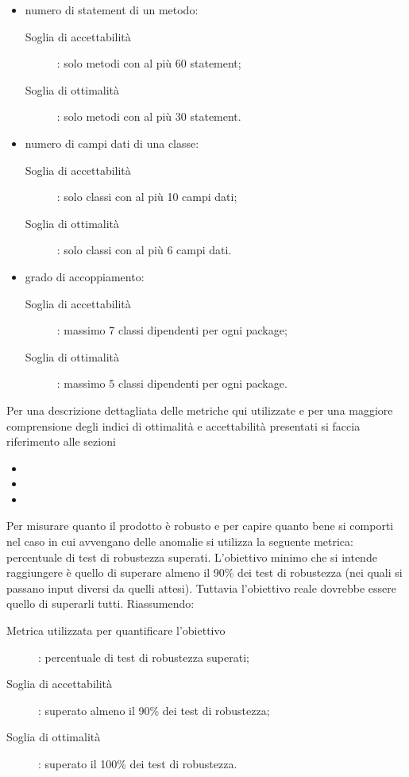 					\begin{itemize}
						\item numero di statement di un metodo:
						\begin{description}
							\item[Soglia di accettabilità]: solo metodi con al più 60 statement;
							\item[Soglia di ottimalità]: solo metodi con al più 30 statement.
						\end{description}
						\item numero di campi dati di una classe:
						\begin{description}
							\item[Soglia di accettabilità]: solo classi con al più 10 campi dati;
							\item[Soglia di ottimalità]: solo classi con al più 6 campi dati.
						\end{description}
						\item grado di accoppiamento:
						\begin{description}
							\item[Soglia di accettabilità]: massimo 7 classi dipendenti per ogni package;
							\item[Soglia di ottimalità]: massimo 5 classi dipendenti per ogni package.
						\end{description}
					\end{itemize}
					Per una descrizione dettagliata delle metriche qui utilizzate e per una maggiore comprensione degli indici di ottimalità e accettabilità presentati si faccia riferimento alle sezioni
					\begin{itemize}
						\item {}
						\item {}
						\item {}
					\end{itemize}			
					Per misurare quanto il prodotto è robusto e per capire quanto bene si comporti nel caso in cui avvengano delle anomalie si utilizza la seguente metrica: percentuale di test di robustezza superati. L'obiettivo minimo che si intende raggiungere è quello di superare almeno il 90\% dei test di robustezza (nei quali si passano input diversi da quelli attesi). Tuttavia l'obiettivo reale dovrebbe essere quello di superarli tutti. Riassumendo:
					\begin{description}
						\item[Metrica utilizzata per quantificare l'obiettivo]: percentuale di test di robustezza superati;
						\item[Soglia di accettabilità]: superato almeno il 90\% dei test di robustezza;
						\item[Soglia di ottimalità]: superato il 100\% dei test di robustezza.
					\end{description}
